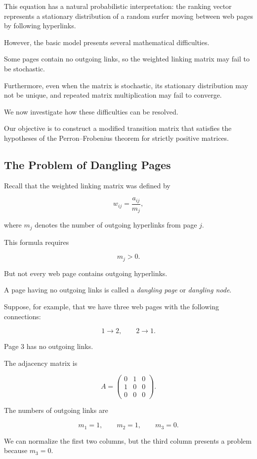 \documentclass[11pt,a4paper]{article}
\theoremstyle{definition}
\theoremstyle{remark}
\begin{document}
This equation has a natural probabilistic
interpretation: the ranking vector
represents a stationary distribution
of a random surfer moving between
web pages by following hyperlinks.

However, the basic model presents
several mathematical difficulties.

Some pages contain no outgoing links,
so the weighted linking matrix
may fail to be stochastic.

Furthermore, even when the matrix
is stochastic, its stationary
distribution may not be unique,
and repeated matrix multiplication
may fail to converge.

We now investigate how these
difficulties can be resolved.

Our objective is to construct
a modified transition matrix
that satisfies the hypotheses
of the Perron--Frobenius theorem
for strictly positive matrices.


\subsection{The Problem of Dangling Pages}

Recall that the weighted linking
matrix was defined by

\[
w_{ij}=\frac{a_{ij}}{m_j},
\]

where $m_j$ denotes the number
of outgoing hyperlinks from page $j$.

This formula requires

\[
m_j>0.
\]

But not every web page
contains outgoing hyperlinks.

A page having no outgoing links
is called a \emph{dangling page}
or \emph{dangling node}.

Suppose, for example, that we
have three web pages with
the following connections:

\[
1\longrightarrow2,
\qquad
2\longrightarrow1.
\]

Page $3$ has no outgoing links.

The adjacency matrix is

\[
A=
\begin{pmatrix}
0&1&0\\
1&0&0\\
0&0&0
\end{pmatrix}.
\]

The numbers of outgoing links are

\[
m_1=1,\qquad
m_2=1,\qquad
m_3=0.
\]

We can normalize the first
two columns, but the third
column presents a problem
because $m_3=0$.
\end{document}
